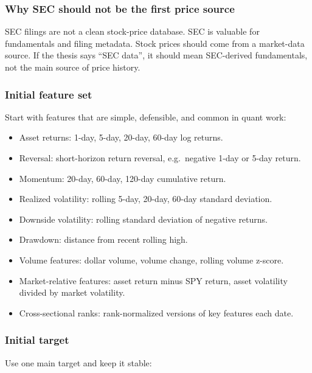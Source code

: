 \subsubsection{Why SEC should not be the first price
source}\label{why-sec-should-not-be-the-first-price-source}

SEC filings are not a clean stock-price database. SEC is valuable for
fundamentals and filing metadata. Stock prices should come from a
market-data source. If the thesis says ``SEC data'', it should mean
SEC-derived fundamentals, not the main source of price history.

\subsubsection{Initial feature set}\label{initial-feature-set}

Start with features that are simple, defensible, and common in quant
work:

\begin{itemize}
\tightlist
\item
  Asset returns: 1-day, 5-day, 20-day, 60-day log returns.
\item
  Reversal: short-horizon return reversal, e.g.~negative 1-day or 5-day
  return.
\item
  Momentum: 20-day, 60-day, 120-day cumulative return.
\item
  Realized volatility: rolling 5-day, 20-day, 60-day standard deviation.
\item
  Downside volatility: rolling standard deviation of negative returns.
\item
  Drawdown: distance from recent rolling high.
\item
  Volume features: dollar volume, volume change, rolling volume z-score.
\item
  Market-relative features: asset return minus SPY return, asset
  volatility divided by market volatility.
\item
  Cross-sectional ranks: rank-normalized versions of key features each
  date.
\end{itemize}

\subsubsection{Initial target}\label{initial-target}

Use one main target and keep it stable:

\begin{Shaded}
\begin{Highlighting}[]
\end{Highlighting}
\end{Shaded}

